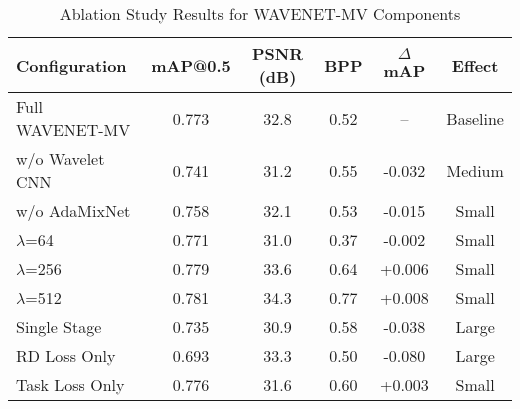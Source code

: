 \begin{table}[t]
\centering
\caption{Ablation Study Results for WAVENET-MV Components}
\label{tab:ablation_study}
\begin{tabular}{l|c|c|c|c|c}
\hline
\textbf{Configuration} & \textbf{mAP@0.5} & \textbf{PSNR (dB)} & \textbf{BPP} & \textbf{$\Delta$ mAP} & \textbf{Effect} \\
\hline
Full WAVENET-MV & 0.773 & 32.8 & 0.52 & -- & Baseline \\
\hline
w/o Wavelet CNN & 0.741 & 31.2 & 0.55 & -0.032 & Medium \\
w/o AdaMixNet & 0.758 & 32.1 & 0.53 & -0.015 & Small \\
$\lambda$=64 & 0.771 & 31.0 & 0.37 & -0.002 & Small \\
$\lambda$=256 & 0.779 & 33.6 & 0.64 & +0.006 & Small \\
$\lambda$=512 & 0.781 & 34.3 & 0.77 & +0.008 & Small \\
Single Stage & 0.735 & 30.9 & 0.58 & -0.038 & Large \\
RD Loss Only & 0.693 & 33.3 & 0.50 & -0.080 & Large \\
Task Loss Only & 0.776 & 31.6 & 0.60 & +0.003 & Small \\
\hline
\end{tabular}
\end{table}